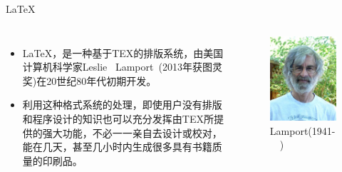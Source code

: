 \documentclass[13pt]{ctexbeamer}
\begin{document}
\begin{frame}{LaTeX}
	\begin{columns}[c]  %
		
		\column{6cm}
		
\begin{itemize}
	\item LaTeX，是一种基于TEX的排版系统，由美国计算机科学家Leslie~ Lamport~(2013年获图灵奖)在20世纪80年代初期开发。
	\item 利用这种格式系统的处理，即使用户没有排版和程序设计的知识也可以充分发挥由TEX所提供的强大功能，不必一一亲自去设计或校对，能在几天，甚至几小时内生成很多具有书籍质量的印刷品。
\end{itemize}
		
	
		\column{5cm} 
		\begin{figure}[p]
			\includegraphics[scale=0.4]{Lamport.jpg}
			\caption{Lamport(1941-~~)}
		\end{figure}
		
	\end{columns}


\end{frame}
\end{document}
